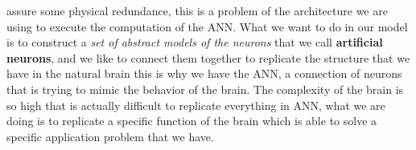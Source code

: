 \documentclass{article}
\begin{document}
assure some physical redundance, this is a problem of the architecture we are using to execute the computation of the ANN.
\newline\newline
What we want to do in our model is to construct a \textit{set of abstract models of the neurons} that we call
\textbf{artificial neurons}, and we like to connect them together to replicate the structure that we have in the
natural brain this is why we have the ANN, a connection of neurons that is trying to mimic the behavior of the brain.
\newline\newline
The complexity of the brain is so high that is actually difficult to replicate everything in ANN,
what we are doing is to replicate a specific function of the brain which is able to solve a specific application
problem that we have.
\pagebreak
\end{document}
